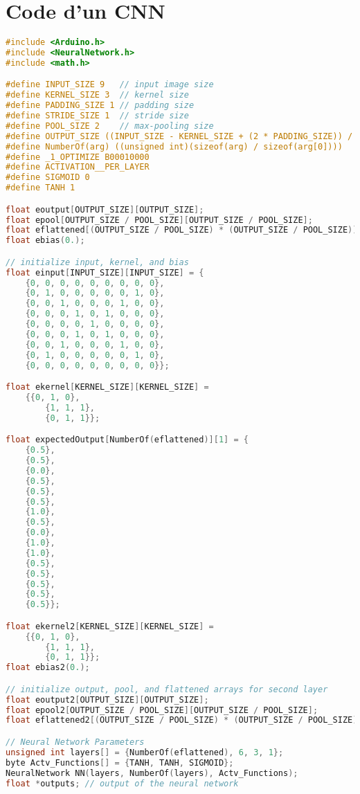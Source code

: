 \section{Code d'un CNN}\label{sec:CNN-code}
\begin{lstlisting}[language=C, caption={Constants for a simple CNN}]
#include <Arduino.h>
#include <NeuralNetwork.h>
#include <math.h>

#define INPUT_SIZE 9   // input image size
#define KERNEL_SIZE 3  // kernel size
#define PADDING_SIZE 1 // padding size
#define STRIDE_SIZE 1  // stride size
#define POOL_SIZE 2    // max-pooling size
#define OUTPUT_SIZE ((INPUT_SIZE - KERNEL_SIZE + (2 * PADDING_SIZE)) / STRIDE_SIZE + 1)
#define NumberOf(arg) ((unsigned int)(sizeof(arg) / sizeof(arg[0])))
#define _1_OPTIMIZE B00010000
#define ACTIVATION__PER_LAYER
#define SIGMOID 0
#define TANH 1

float eoutput[OUTPUT_SIZE][OUTPUT_SIZE];
float epool[OUTPUT_SIZE / POOL_SIZE][OUTPUT_SIZE / POOL_SIZE];
float eflattened[(OUTPUT_SIZE / POOL_SIZE) * (OUTPUT_SIZE / POOL_SIZE)][1];
float ebias(0.);

// initialize input, kernel, and bias
float einput[INPUT_SIZE][INPUT_SIZE] = {
    {0, 0, 0, 0, 0, 0, 0, 0, 0},
    {0, 1, 0, 0, 0, 0, 0, 1, 0},
    {0, 0, 1, 0, 0, 0, 1, 0, 0},
    {0, 0, 0, 1, 0, 1, 0, 0, 0},
    {0, 0, 0, 0, 1, 0, 0, 0, 0},
    {0, 0, 0, 1, 0, 1, 0, 0, 0},
    {0, 0, 1, 0, 0, 0, 1, 0, 0},
    {0, 1, 0, 0, 0, 0, 0, 1, 0},
    {0, 0, 0, 0, 0, 0, 0, 0, 0}};

float ekernel[KERNEL_SIZE][KERNEL_SIZE] =
    {{0, 1, 0},
        {1, 1, 1},
        {0, 1, 1}};

float expectedOutput[NumberOf(eflattened)][1] = {
    {0.5},
    {0.5},
    {0.0},
    {0.5},
    {0.5},
    {0.5},
    {1.0},
    {0.5},
    {0.0},
    {1.0},
    {1.0},
    {0.5},
    {0.5},
    {0.5},
    {0.5},
    {0.5}};

float ekernel2[KERNEL_SIZE][KERNEL_SIZE] = 
    {{0, 1, 0},
        {1, 1, 1},
        {0, 1, 1}};
float ebias2(0.);

// initialize output, pool, and flattened arrays for second layer
float eoutput2[OUTPUT_SIZE][OUTPUT_SIZE];
float epool2[OUTPUT_SIZE / POOL_SIZE][OUTPUT_SIZE / POOL_SIZE];
float eflattened2[(OUTPUT_SIZE / POOL_SIZE) * (OUTPUT_SIZE / POOL_SIZE)][1];

// Neural Network Parameters
unsigned int layers[] = {NumberOf(eflattened), 6, 3, 1};
byte Actv_Functions[] = {TANH, TANH, SIGMOID};
NeuralNetwork NN(layers, NumberOf(layers), Actv_Functions);
float *outputs; // output of the neural network


\end{lstlisting}
